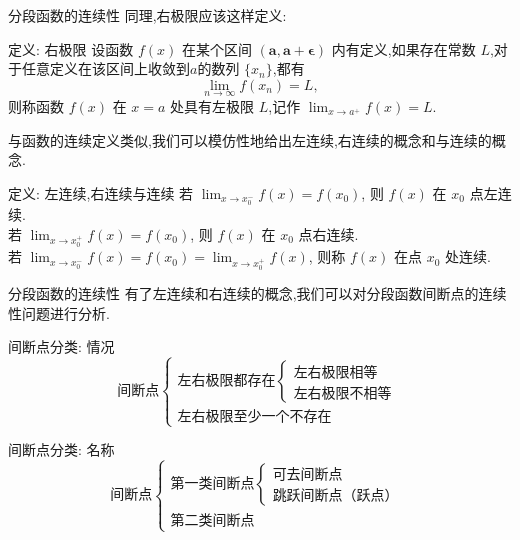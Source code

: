 \documentclass[
10pt,
aspectratio=43,
]{beamer}
\begin{document}
\begin{frame}{分段函数的连续性}
	同理,右极限应该这样定义: 
	\begin{block}{定义: 右极限}
			设函数 $f(x)$ 在某个区间 $\bm{(a,a+\epsilon)}$ 内有定义,如果存在常数 $L$,对于任意定义在该区间上收敛到$a$的数列 $\{x_n\}$,都有 
		\begin{equation*}
		\lim_{n\to\infty} f(x_n) = L,
		\end{equation*}
		则称函数 $f(x)$ 在 $x=a$ 处具有左极限 $L$,记作 $\lim_{x \to a^{+}} f(x) = L$.
	\end{block}
	与函数的连续定义类似,我们可以模仿性地给出左连续,右连续的概念和与连续的概念.
	\begin{block}{定义: 左连续,右连续与连续}
		若 $\lim _{x \rightarrow x_0^{-}} f(x)=f\left(x_0\right)$,  则 $f(x)$ 在 $x_0$ 点左连续.\\
		若 $\lim _{x \rightarrow x_0^{+}} f(x)=f\left(x_0\right) $, 则 $f(x)$ 在 $x_0$ 点右连续.\\
		若 $\lim _{x \rightarrow x_0^{-}} f(x)=f\left(x_0\right)=\lim _{x \rightarrow x_0^{+}} f(x)$, 则称 $f(x)$ 在点 $x_0$ 处连续.
	\end{block}
\end{frame}

\begin{frame}{分段函数的连续性}
	有了左连续和右连续的概念,我们可以对分段函数间断点的连续性问题进行分析.
	\begin{block}{间断点分类: 情况}
		\begin{equation*}
			\text{间断点}\left\{
				\begin{array}{ll}
					\text{左右极限都存在}\left\{
						\begin{array}{ll}
							\text{左右极限相等}\\
							\text{左右极限不相等}
						\end{array}
					\right.\\
					\text{左右极限至少一个不存在}
				\end{array}
			\right.
		\end{equation*}
	\end{block}
	\begin{exampleblock}{间断点分类: 名称}
		\begin{equation*}
			\text{间断点}\left\{
				\begin{array}{ll}
					\text{第一类间断点}\left\{
						\begin{array}{ll}
							\text{可去间断点}\\
							\text{跳跃间断点（跃点）}
						\end{array}
					\right.\\
					\text{第二类间断点}
				\end{array}
			\right.
		\end{equation*}
	\end{exampleblock}
\end{frame}
\end{document}
